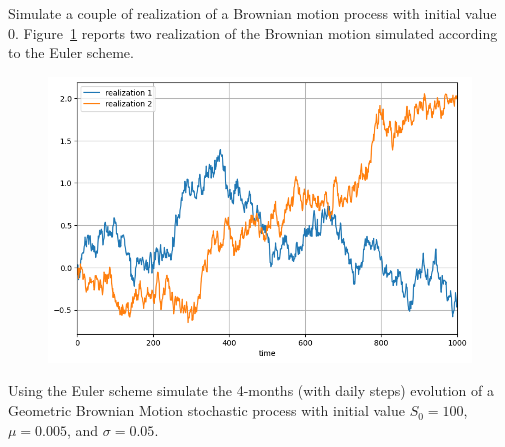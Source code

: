 \documentclass[12pt,a4paper]{article}
\begin{document}
\begin{question}
Simulate a couple of realization of a Brownian motion process with initial value 0.
Figure~\ref{fig:brownian_motion} reports two realization of the Brownian motion simulated according to the Euler scheme.

\begin{figure}[htbp]
\begin{center}
\includegraphics[width=0.5\linewidth]{addons/brownian_motion}
\end{center}
\label{fig:brownian_motion}
\end{figure}
\end{question}

\begin{question}
Using the Euler scheme simulate the 4-months (with daily steps) evolution of a Geometric Brownian Motion stochastic process with initial value $S_0=100$, $\mu=0.005$, and $\sigma=0.05$.
\end{question}
\end{document}
